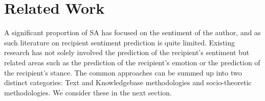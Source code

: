 \begin{comment}
As a new technology, Wireless Sensor Networks (WSNs) has a wide
range of applications \cite{Culler-01, Bahl-02, Akyildiz-01}, including
environment monitoring, smart buildings, medical care, industrial and
military applications. Among them, a recent trend is to develop
commercial sensor networks that require pervasive sensing of both
environment and human beings, for example, assisted living
\cite{Akyildiz-02, Harvard-01,CROSSBOW} and smart homes
\cite{Harvard-01, Adya-01,CROSSBOW}.
\begin{quote}
  ``For these applications, sensor devices are incorporated into human
  cloths \cite{Natarajan-01, Zhou-06, Bahl-02, Adya-01} for monitoring
  health related information like EKG readings, fall detection, and
  voice recognition''.
\end{quote}
While collecting all these multimedia information
\cite{Akyildiz-02} requires a high network throughput, off-the-shelf
sensor devices only provide very limited bandwidth in a single
channel: 19.2\,Kbps in MICA2 \cite{Bahl-02} and 250\,Kbps in MICAz.

In this article, we propose MMSN, abbreviation for Multifrequency
Media access control for wireless Sensor Networks. The main
contributions of this work can be summarized as follows.
\begin{itemize}
\item To the best of our knowledge, the MMSN protocol is the first
multifrequency MAC protocol especially designed for WSNs, in which
each device is equipped with a single radio transceiver and
the MAC layer packet size is very small.
\item Instead of using pairwise RTS/CTS frequency negotiation
\cite{Adya-01, Culler-01, Tzamaloukas-01, Zhou-06},
we propose lightweight frequency assignments, which are good choices
for many deployed comparatively static WSNs.
\item We develop new toggle transmission and snooping techniques to
enable a single radio transceiver in a sensor device to achieve
scalable performance, avoiding the nonscalable ``one
control channel + multiple data channels'' design \cite{Natarajan-01}.
\end{itemize}
\end{comment}

\section{Related Work}
A significant proportion of SA has focused on the sentiment of the author, and as such literature on recipient sentiment prediction is quite limited. Existing research has not solely involved the prediction of the recipient's sentiment but related areas such as the prediction of the recipient's emotion or the prediction of the recipient's stance. The common approaches can be summed up into two distinct categories: Text and Knowledgebase methodologies and socio-theoretic methodologies. We consider these in the next section.
